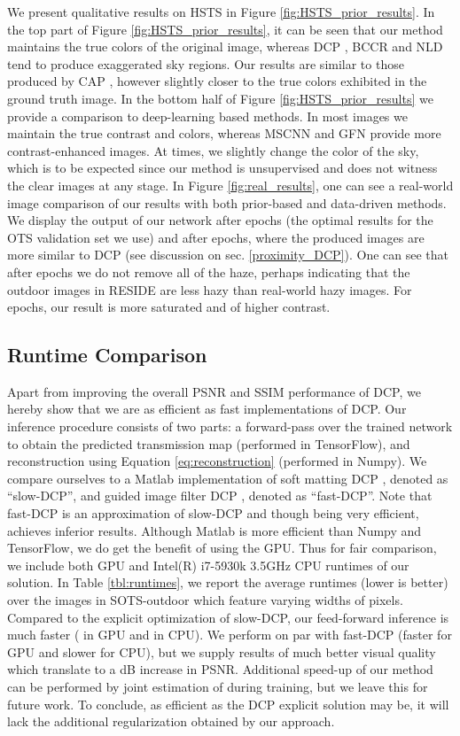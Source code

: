 \documentclass[10pt,twocolumn,twoside]{IEEEtran}
\begin{document}
We present qualitative results on HSTS in Figure \ref{fig:HSTS_prior_results}. In the top part of Figure \ref{fig:HSTS_prior_results}, it can be seen that our method maintains the true colors of the original image, whereas DCP \cite{DCP}, BCCR \cite{BCCR} and NLD \cite{NLD} tend to produce exaggerated sky regions. Our results are similar to those produced by CAP \cite{CAP}, however slightly closer to the true colors exhibited in the ground truth image. In the bottom half of Figure \ref{fig:HSTS_prior_results} we provide a comparison to deep-learning based methods. In most images we maintain the true contrast and colors, whereas MSCNN \cite{mscnn} and GFN \cite{GFN} provide more contrast-enhanced images. At times, we slightly change the color of the sky, which is to be expected since our method is unsupervised and does not witness the clear images at any stage. In Figure \ref{fig:real_results}, one can see a real-world image comparison of our results with both prior-based and data-driven methods. We display the output of our network after  epochs (the optimal results for the OTS validation set we use) and after  epochs, where the produced images are more similar to DCP (see discussion on sec. \ref{proximity_DCP}). One can see that after  epochs we do not remove all of the haze, perhaps indicating that the outdoor images in RESIDE are less hazy than real-world hazy images. For  epochs, our result is more saturated and of higher contrast.

\subsection{Runtime Comparison}

Apart from improving the overall PSNR and SSIM performance of DCP, we hereby show that we are as efficient as fast implementations of DCP. Our inference procedure consists of two parts: a forward-pass over the trained network to obtain the predicted transmission map (performed in TensorFlow), and reconstruction using Equation \ref{eq:reconstruction} (performed in Numpy). We compare ourselves to a Matlab implementation of soft matting DCP \cite{DCP}, denoted as ``slow-DCP'', and guided image filter DCP \cite{fast_DCP}, denoted as ``fast-DCP''. Note that fast-DCP is an approximation of slow-DCP and though being very efficient, achieves inferior results. Although Matlab is more efficient than Numpy and TensorFlow, we do get the benefit of using the GPU. Thus for fair comparison, we include both GPU and Intel(R) i7-5930k 3.5GHz CPU runtimes of our solution. In Table \ref{tbl:runtimes}, we report the average runtimes (lower is better) over the  images in SOTS-outdoor which feature varying widths of  pixels. Compared to the explicit optimization of slow-DCP, our feed-forward inference is much faster ( in GPU and  in CPU). We perform on par with fast-DCP (faster for GPU and slower for CPU), but we supply results of much better visual quality which translate to a  dB increase in PSNR. Additional speed-up of our method can be performed by joint estimation of  during training, but we leave this for future work. To conclude, as efficient as the DCP explicit solution may be, it will lack the additional regularization obtained by our approach.
\end{document}
